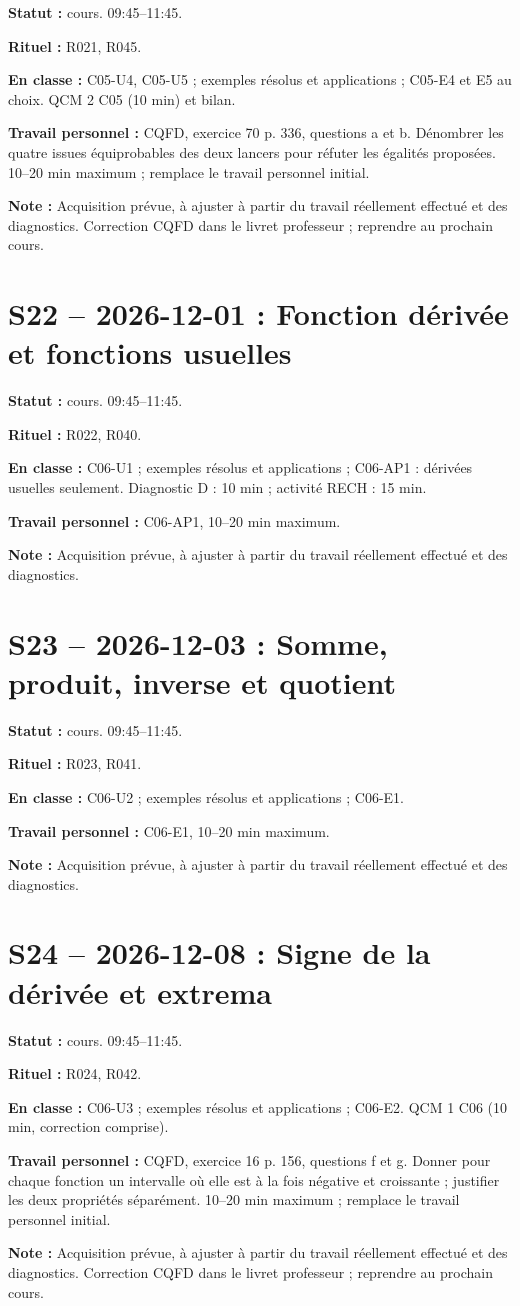 \textbf{Statut :} cours. 09:45–11:45.\par\textbf{Rituel :} R021, R045.\par\textbf{En classe :} C05-U4, C05-U5 ; exemples résolus et applications ; C05-E4 et E5 au choix.  QCM 2 C05 (10 min) et bilan.\par\textbf{Travail personnel :} CQFD, exercice 70 p. 336, questions a et b. Dénombrer les quatre issues équiprobables des deux lancers pour réfuter les égalités proposées. 10–20 min maximum ; remplace le travail personnel initial.\par\textbf{Note :} Acquisition prévue, à ajuster à partir du travail réellement effectué et des diagnostics. Correction CQFD dans le livret professeur ; reprendre au prochain cours.
\section*{S22 -- 2026-12-01 : Fonction dérivée et fonctions usuelles}
\textbf{Statut :} cours. 09:45–11:45.\par\textbf{Rituel :} R022, R040.\par\textbf{En classe :} C06-U1 ; exemples résolus et applications ; C06-AP1 : dérivées usuelles seulement. Diagnostic D : 10 min ; activité RECH : 15 min.\par\textbf{Travail personnel :} C06-AP1, 10–20 min maximum.\par\textbf{Note :} Acquisition prévue, à ajuster à partir du travail réellement effectué et des diagnostics.
\section*{S23 -- 2026-12-03 : Somme, produit, inverse et quotient}
\textbf{Statut :} cours. 09:45–11:45.\par\textbf{Rituel :} R023, R041.\par\textbf{En classe :} C06-U2 ; exemples résolus et applications ; C06-E1. \par\textbf{Travail personnel :} C06-E1, 10–20 min maximum.\par\textbf{Note :} Acquisition prévue, à ajuster à partir du travail réellement effectué et des diagnostics.
\section*{S24 -- 2026-12-08 : Signe de la dérivée et extrema}
\textbf{Statut :} cours. 09:45–11:45.\par\textbf{Rituel :} R024, R042.\par\textbf{En classe :} C06-U3 ; exemples résolus et applications ; C06-E2.  QCM 1 C06 (10 min, correction comprise).\par\textbf{Travail personnel :} CQFD, exercice 16 p. 156, questions f et g. Donner pour chaque fonction un intervalle où elle est à la fois négative et croissante ; justifier les deux propriétés séparément. 10–20 min maximum ; remplace le travail personnel initial.\par\textbf{Note :} Acquisition prévue, à ajuster à partir du travail réellement effectué et des diagnostics. Correction CQFD dans le livret professeur ; reprendre au prochain cours.
